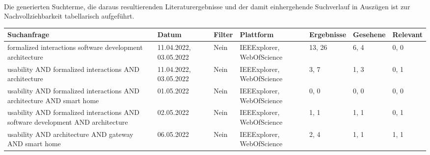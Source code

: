         \\
        Die generierten Suchterme, die daraus resultierenden Literaturergebnisse und der damit einhergehende Suchverlauf in Auszügen ist 
        zur Nachvollziehbarkeit tabellarisch aufgeführt.
        \\
        \linebreak
        \pagebreak
        \begin{table}[hbt!]
            \begin{center}
                \begin{tabular}{| p{2.9cm} | p{1.9cm} | p{1.6cm} | p{1.9cm} | p{1.9cm} | p{1.8cm} | p{1.8cm} | }
                    \hline
                        \textbf{Suchanfrage} & \textbf{Datum} & \textbf{Filter} & \textbf{Plattform} & \textbf{Ergebnisse} & \textbf{Gesehene} & \textbf{Relevant} \\
                    \hline
                        formalized interactions software development architecture  & 11.04.2022, 03.05.2022 & Nein & IEEExplorer, WebOfScience & 13, 26 & 6, 4 & 0, 0 \\ 
                    \hline
                        usability AND formalized interactions AND architecture & 11.04.2022, 03.05.2022 & Nein & IEEExplorer, WebOfScience & 3, 7 & 1, 3 & 0, 1 \\ %
                    \hline
                        usability AND formalized interactions AND architecture AND smart home & 01.05.2022 & Nein & IEEExplorer, WebOfScience & 0, 0 & 0, 0 & 0, 0 \\
                    \hline
                        usability AND formalized interactions AND software development AND architecture & 02.05.2022 & Nein & IEEExplorer, WebOfScience & 1, 1 & 1, 1 & 0, 1 \\
                    \hline
                        usability AND architecture AND gateway AND smart home & 06.05.2022 & Nein & IEEExplorer, WebOfScience & 2, 4 & 1, 1 & 1, 1 \\

\end{tabular}
\end{center}
\end{table}
